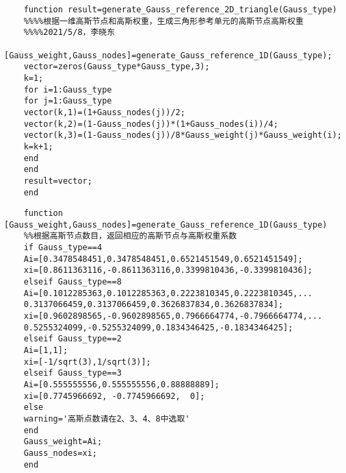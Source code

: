 	\begin{verbatim}
	function result=generate_Gauss_reference_2D_triangle(Gauss_type)
	%%%%根据一维高斯节点和高斯权重，生成三角形参考单元的高斯节点高斯权重
	%%%%2021/5/8，李晓东
	[Gauss_weight,Gauss_nodes]=generate_Gauss_reference_1D(Gauss_type);
	vector=zeros(Gauss_type*Gauss_type,3);
	k=1;
	for i=1:Gauss_type
	for j=1:Gauss_type
	vector(k,1)=(1+Gauss_nodes(j))/2;
	vector(k,2)=(1-Gauss_nodes(j))*(1+Gauss_nodes(i))/4;
	vector(k,3)=(1-Gauss_nodes(j))/8*Gauss_weight(j)*Gauss_weight(i);
	k=k+1;
	end
	end
	result=vector;
	end
	\end{verbatim}
	\begin{verbatim}
	function [Gauss_weight,Gauss_nodes]=generate_Gauss_reference_1D(Gauss_type)
	%%根据高斯节点数目，返回相应的高斯节点与高斯权重系数
	if Gauss_type==4
	Ai=[0.3478548451,0.3478548451,0.6521451549,0.6521451549];
	xi=[0.8611363116,-0.8611363116,0.3399810436,-0.3399810436];
	elseif Gauss_type==8
	Ai=[0.1012285363,0.1012285363,0.2223810345,0.2223810345,...
	0.3137066459,0.3137066459,0.3626837834,0.3626837834];
	xi=[0.9602898565,-0.9602898565,0.7966664774,-0.7966664774,...
	0.5255324099,-0.5255324099,0.1834346425,-0.1834346425];
	elseif Gauss_type==2
	Ai=[1,1];
	xi=[-1/sqrt(3),1/sqrt(3)];
	elseif Gauss_type==3
	Ai=[0.555555556,0.555555556,0.88888889];
	xi=[0.7745966692, -0.7745966692,  0];
	else
	warning='高斯点数请在2、3、4、8中选取'
	end
	Gauss_weight=Ai;
	Gauss_nodes=xi;
	end
	\end{verbatim}